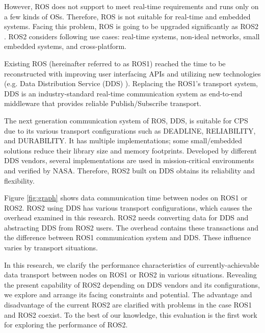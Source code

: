 \documentclass{sig-alternate-ipsn13}
\begin{document}
However, ROS does not support to meet real-time requirements and runs only on a few kinds of OSs. Therefore, ROS is not suitable for real-time and embedded systems. Facing this problem, ROS is going to be upgraded significantly as ROS2 \cite{ros2_iccps2016}. ROS2 considers following use cases: real-time systems, non-ideal networks, small embedded systems, and cross-platform.

Existing ROS (hereinafter referred to as ROS1) reached the time to be reconstructed with improving user interfacing APIs and utilizing new technologies (e.g. Data Distribution Service (DDS) \cite{pardo2003omg}). Replacing the ROS1's transport system, DDS is an industry-standard real-time communication system as end-to-end middleware that provides reliable Publish/Subscribe transport.

The next generation communication system of ROS, DDS, is suitable for CPS due to its various transport configurations such as DEADLINE, RELIABILITY, and DURABILITY. It has multiple implementations; some small/embedded solutions reduce their library size and memory footprints. Developed by different DDS vendors, several implementations are used in mission-critical environments and verified by NASA. Therefore, ROS2 built on DDS obtains its reliability and flexibility.

Figure \ref{fig:graph} shows data communication time between nodes on ROS1 or ROS2. ROS2 using DDS has various transport configurations, which causes the overhead examined in this research. ROS2 needs converting data for DDS and abstracting DDS from ROS2 users. The overhead contains these transactions and the difference between ROS1 communication system and DDS. These influence varies by transport situations.

In this research, we clarify the performance characteristics of currently-achievable data transport between nodes on ROS1 or ROS2 in various situations. Revealing the present capability of ROS2 depending on DDS vendors and its configurations, we explore and arrange its facing constraints and potential. The advantage and disadvantage of the current ROS2 are clarified with problems in the case ROS1 and ROS2 coexist. To the best of our knowledge, this evaluation is the first work for exploring the performance of ROS2.

\end{document}
